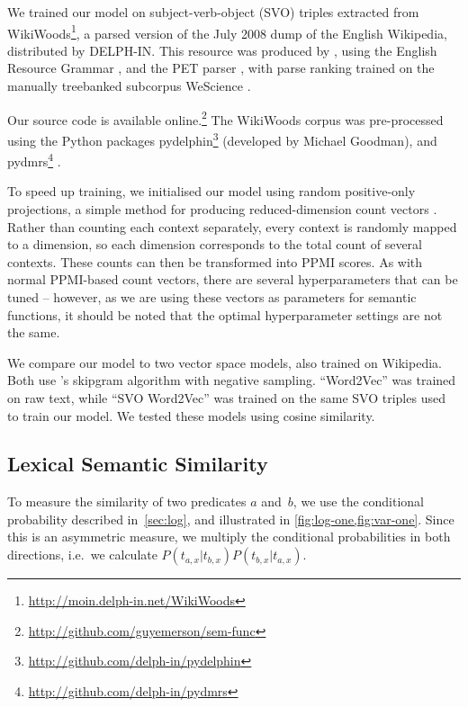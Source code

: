 \documentclass[11pt]{article}
\begin{document}
We trained our model on subject-verb-object (SVO) triples extracted from
WikiWoods\footnote{\url{http://moin.delph-in.net/WikiWoods}},
a parsed version of the July 2008 dump of the English Wikipedia,
distributed by DELPH-IN.
This resource was produced by ,
using the English Resource Grammar \cite{flickinger2000erg,flickinger2011erg},
and the PET parser \cite{callmeier2001pet,toutanova2005pet},
with parse ranking trained on the manually treebanked subcorpus WeScience \cite{ytrestol2009wescience}.

Our source code is available online.\footnote{\url{http://github.com/guyemerson/sem-func}}
The WikiWoods corpus was pre-processed using the Python packages
pydelphin\footnote{\url{http://github.com/delph-in/pydelphin}} (developed by Michael Goodman),
and pydmrs\footnote{\url{http://github.com/delph-in/pydmrs}} \cite{copestake2016pydmrs}.

To speed up training, we initialised our model using random positive-only projections,
a simple method for producing reduced-dimension count vectors \cite{qasemizadeh2016vector}.
Rather than counting each context separately,
every context is randomly mapped to a dimension,
so each dimension corresponds to the total count of several contexts.
These counts can then be transformed into PPMI scores.
As with normal PPMI-based count vectors,
there are several hyperparameters that can be tuned \cite{levy2015hyperparam} --
however, as we are using these vectors as parameters for semantic functions,
it should be noted that the optimal hyperparameter settings are not the same.

We compare our model to two vector space models, also trained on Wikipedia.
Both use 's
skipgram algorithm with negative sampling.
 ``Word2Vec'' was trained on raw text, while
``SVO Word2Vec'' was trained on the same SVO triples used to train our model.
We tested these models using cosine similarity.


\subsection{Lexical Semantic Similarity}
\label{sec:sim}

To measure the similarity of two predicates $a$ and~$b$,
we use the conditional probability described in~\cref{sec:log},
and illustrated in \cref{fig:log-one,fig:var-one}.
Since this is an asymmetric measure,
we multiply the conditional probabilities in both directions,
i.e.\ we calculate ${P(t_{a,x}|t_{b,x})P(t_{b,x}|t_{a,x})}$.
\end{document}
